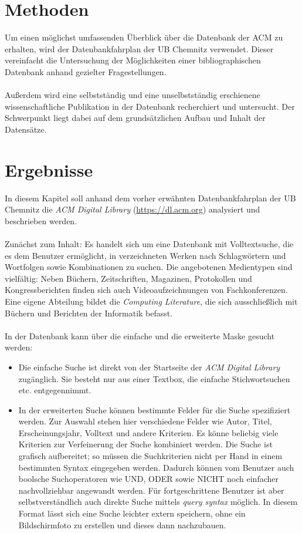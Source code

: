 \documentclass[
	ngerman,
	parskip=half,
	headsepline,
	fontsize=12pt,
	DIV=13,
	listof=leveldown,
	]{scrreprt}
\begin{document}
	\chapter{Methoden}
	Um einen möglichst umfassenden Überblick über die Datenbank der ACM zu erhalten, wird der Datenbankfahrplan der UB Chemnitz \cite{resource:dbf} verwendet. Dieser vereinfacht die Untersuchung der Möglichkeiten einer bibliographischen Datenbank anhand gezielter Fragestellungen.
\ \\	
\ \\
	Außerdem wird eine selbstständig und eine unselbstständig erschienene wissenschaftliche Publikation in der Datenbank recherchiert und untersucht. Der Schwerpunkt liegt dabei auf dem grundsätzlichen Aufbau und Inhalt der Datensätze.
	
	
		\chapter{Ergebnisse}
	In diesem Kapitel soll anhand dem vorher erwähnten Datenbankfahrplan der UB Chemnitz \cite{resource:dbf} die \textsl{ACM Digital Library} (\url{https://dl.acm.org}) analysiert und beschrieben werden. 
		\ \\
		\ \\
		Zunächst zum Inhalt: Es handelt sich um eine Datenbank mit Volltextsuche, die es dem Benutzer ermöglicht, in verzeichneten Werken nach Schlagwörtern und Wortfolgen sowie Kombinationen zu suchen. Die angebotenen Medientypen sind vielfältig: Neben Büchern, Zeitschriften, Magazinen, Protokollen und Kongressberichten finden sich auch Videoaufzeichnungen von Fachkonferenzen.
		\ \\
		Eine eigene Abteilung bildet die \textsl{Computing Literature}, die sich ausschließlich mit Büchern und Berichten der Informatik befasst.
		\ \\
		\ \\
		In der Datenbank kann über die einfache und die erweiterte Maske gesucht werden:
		\begin{itemize}
		\item Die einfache Suche ist direkt von der Startseite der \textsl{ACM Digital Library} zugänglich. Sie besteht nur aus einer Textbox, die einfache Stichwortsuchen etc. entgegennimmt.
		\item In der erweiterten Suche können bestimmte Felder für die Suche spezifiziert werden. Zur Auswahl stehen hier verschiedene Felder wie Autor, Titel, Erscheinungsjahr, Volltext und andere Kriterien. Es könne beliebig viele Kriterien zur Verfeinerung der Suche kombiniert werden. Die Suche ist grafisch aufbereitet; so müssen die Suchkriterien nicht per Hand in einem bestimmten Syntax eingegeben werden. Dadurch können vom Benutzer auch boolsche Suchoperatoren wie UND, ODER sowie NICHT noch einfacher nachvollziehbar angewandt werden. Für fortgeschrittene Benutzer ist aber selbstverständlich auch direkte Suche mittels \textit{query syntax} möglich. In diesem Format lässt sich eine Suche leichter extern speichern, ohne ein Bildschirmfoto zu erstellen und dieses dann nachzubauen.
		\end{itemize}
\end{document}
